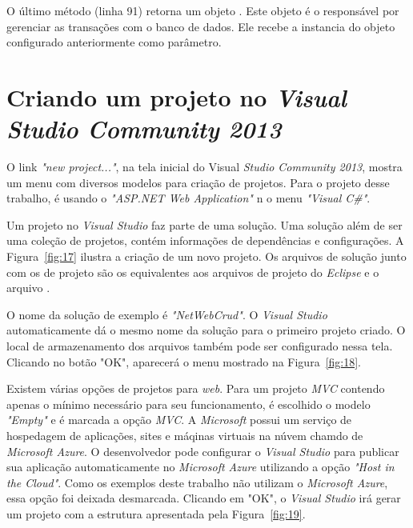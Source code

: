 O último método (linha 91) retorna um objeto . Este objeto é o responsável por gerenciar as transações com o banco de dados. Ele recebe a instancia do objeto  configurado anteriormente como parâmetro.

\section{Criando um projeto \anmvc no \textit{Visual Studio Community 2013}}

O link \textit{"new project..."}, na tela inicial do Visual \textit{Studio Community 2013}, mostra um menu com diversos modelos para criação de projetos. Para o projeto desse trabalho, é usando o \textit{"ASP.NET Web Application"} n o menu \textit{"Visual C\#"}.

Um projeto no \textit{Visual Studio} faz parte de uma solução. Uma solução além de ser uma coleção de projetos, contém informações de dependências e configurações. A Figura~\ref{fig:17} ilustra a criação de um novo projeto. Os arquivos de solução junto com os de projeto são os equivalentes aos arquivos de projeto do \textit{Eclipse} e o arquivo .


O nome da solução de exemplo é \textit{"NetWebCrud"}. O \textit{Visual Studio} automaticamente dá o mesmo nome da solução para o primeiro projeto criado. O local de armazenamento dos arquivos também pode ser configurado nessa tela. Clicando no botão "OK", aparecerá o menu mostrado na Figura~\ref{fig:18}.


Existem várias opções de projetos para \textit{web}. Para um projeto \textit{MVC} contendo apenas o mínimo necessário para seu funcionamento, é escolhido o modelo \textit{"Empty"} e é marcada a opção \textit{MVC}. A \textit{Microsoft} possui um serviço de hospedagem de aplicações, sites e máqinas virtuais na núvem chamdo de \textit{Microsoft Azure}. O desenvolvedor pode configurar o \textit{Visual Studio} para publicar sua aplicação automaticamente no \textit{Microsoft Azure} utilizando a opção \textit{"Host in the Cloud"}. Como os exemplos deste trabalho não utilizam o \textit{Microsoft Azure}, essa opção foi deixada desmarcada. Clicando em "OK", o \textit{Visual Studio} irá gerar um projeto com a estrutura apresentada pela Figura~\ref{fig:19}.

